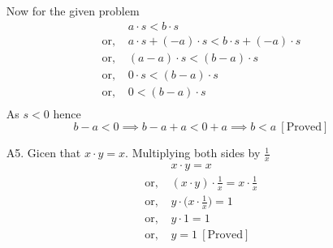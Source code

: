 \documentclass{article}
\begin{document}
\begin{enumerate}
		\hspace{1cm}Now for the given problem
		\begin{align*}
			& a\cdot s<b\cdot s\\
			\text{or, } & a\cdot s+(-a)\cdot s<b\cdot s+(-a)\cdot s\\
			\text{or, } & (a-a)\cdot s<(b-a)\cdot s\\
			\text{or, } & 0\cdot s<(b-a)\cdot s\\
			\text{or, } & 0<(b-a)\cdot s\\
		\end{align*}
		As $s<0$ hence $$b-a<0\implies b-a+a<0+a\implies b<a\ [\text{Proved}]$$
		\item[A5.] Gicen that $x\cdot y=x$. Multiplying both sides by $\frac1x$\begin{align*}
			& x\cdot y=x\\
			\text{or, } & (x\cdot y)\cdot \frac1x=x\cdot \frac1x\\
			\text{or, } & y\cdot \bigg(x\cdot \frac1x\bigg)=1\\
			\text{or, } & y\cdot 1=1\\
			\text{or, } &  y=1\ [\text{Proved}]
		\end{align*}
	\end{enumerate}
\end{document}
